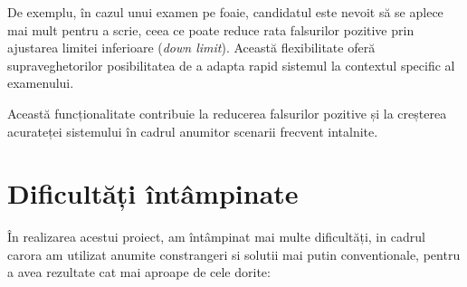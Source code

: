 \documentclass[12pt,a4paper]{article}
\begin{document}
De exemplu, în cazul unui examen pe foaie, candidatul este nevoit să se aplece mai mult pentru a scrie, ceea ce poate reduce rata falsurilor pozitive prin ajustarea limitei inferioare (\textit{down limit}). Această flexibilitate oferă supraveghetorilor posibilitatea de a adapta rapid sistemul la contextul specific al examenului.

Această funcționalitate contribuie la reducerea falsurilor pozitive și la creșterea acurateței sistemului în cadrul anumitor scenarii frecvent intalnite.

\section{Dificultăți întâmpinate}

În realizarea acestui proiect, am întâmpinat mai multe dificultăți, in cadrul carora am utilizat anumite constrangeri si solutii mai putin conventionale, pentru a avea rezultate cat mai aproape de cele dorite:
\end{document}
